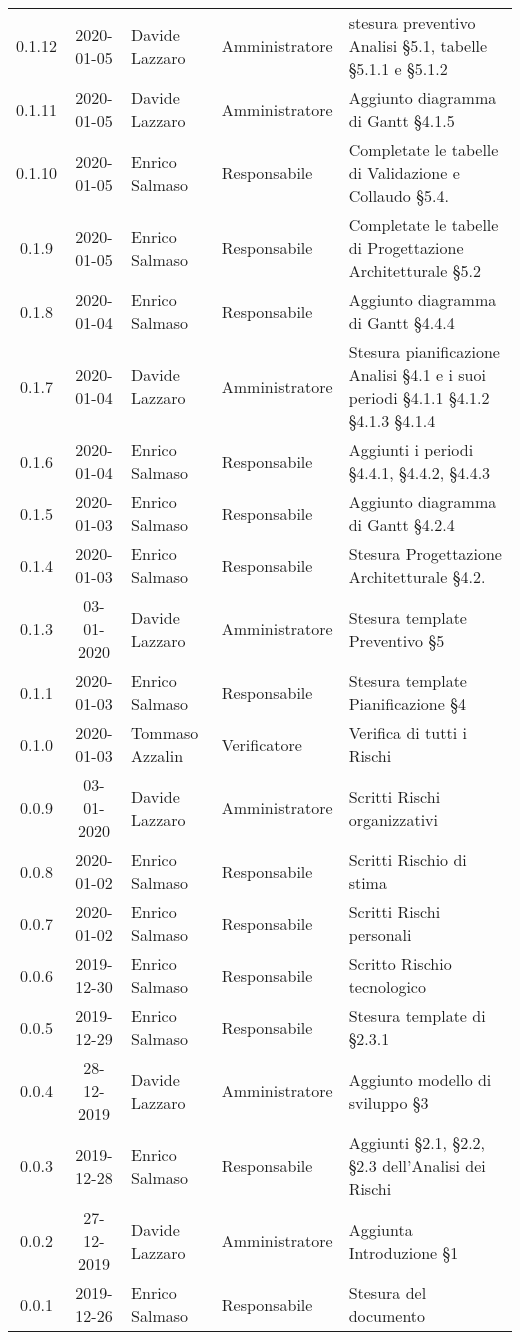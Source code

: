 {\begin{longtable}{ c c  C{4cm}  C{3cm} C{4cm}}
0.1.12 & 2020-01-05 & Davide Lazzaro & Amministratore & stesura preventivo Analisi §5.1, tabelle §5.1.1 e §5.1.2 \\
0.1.11 & 2020-01-05 & Davide Lazzaro & Amministratore & Aggiunto diagramma di Gantt §4.1.5 \\
0.1.10 & 2020-01-05 & Enrico Salmaso & Responsabile & Completate le tabelle di Validazione e Collaudo §5.4.\\
0.1.9 & 2020-01-05 & Enrico Salmaso & Responsabile & Completate le tabelle di Progettazione Architetturale §5.2\\
0.1.8 & 2020-01-04 & Enrico Salmaso & Responsabile & Aggiunto diagramma di Gantt §4.4.4 \\
0.1.7 & 2020-01-04 & Davide Lazzaro & Amministratore & Stesura pianificazione Analisi §4.1 e i suoi periodi §4.1.1 §4.1.2 §4.1.3 §4.1.4 \\
0.1.6 & 2020-01-04 & Enrico Salmaso & Responsabile & Aggiunti i periodi §4.4.1, §4.4.2, §4.4.3\\
0.1.5 & 2020-01-03 & Enrico Salmaso & Responsabile & Aggiunto diagramma di Gantt §4.2.4\\
0.1.4 & 2020-01-03 & Enrico Salmaso & Responsabile & Stesura Progettazione Architetturale §4.2.\\
0.1.3 & 03-01-2020 & Davide Lazzaro & Amministratore & Stesura template Preventivo §5\\
0.1.1 & 2020-01-03 &  Enrico Salmaso & Responsabile & Stesura template Pianificazione §4\\
0.1.0 & 2020-01-03 & Tommaso Azzalin & Verificatore & Verifica di tutti i Rischi  \\
0.0.9 & 03-01-2020 & Davide Lazzaro & Amministratore & Scritti Rischi organizzativi \\
0.0.8 & 2020-01-02 &  Enrico Salmaso & Responsabile & Scritti Rischio di stima \\
0.0.7 & 2020-01-02 & Enrico Salmaso & Responsabile & Scritti Rischi personali \\
0.0.6 & 2019-12-30 & Enrico Salmaso & Responsabile & Scritto Rischio tecnologico \\
0.0.5 & 2019-12-29 & Enrico Salmaso & Responsabile & Stesura template di §2.3.1\\
0.0.4 & 28-12-2019 & Davide Lazzaro & Amministratore & Aggiunto modello di sviluppo §3\\
0.0.3 & 2019-12-28 & Enrico Salmaso & Responsabile & Aggiunti §2.1, §2.2, §2.3 dell'Analisi dei Rischi \\
0.0.2 & 27-12-2019 & Davide Lazzaro & Amministratore & Aggiunta Introduzione §1 \\
0.0.1 & 2019-12-26 & Enrico Salmaso & Responsabile & Stesura del documento  \\
		
\end{longtable}
}